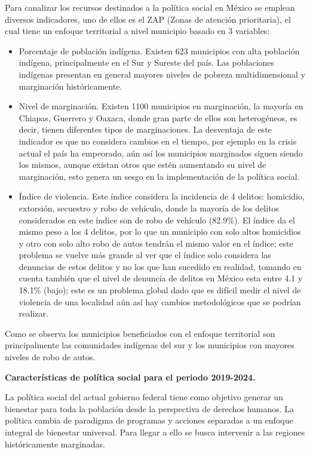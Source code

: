 Para canalizar los recursos destinados a la política social en México se emplean diversos indicadores, uno de ellos es el ZAP (Zonas de atención prioritaria), el cual tiene un enfoque territorial a nivel municipio basado en 3 variables:
\begin{itemize}
    \item Porcentaje de población indígena. Existen 623 municipios con alta población indígena, principalmente en el Sur y Sureste del país. Las poblaciones indígenas presentan en general mayores niveles de pobreza multidimensional y marginación históricamente.
    \item Nivel de marginación. Existen 1100 municipios en marginación, la mayoría en Chiapas, Guerrero y Oaxaca, donde gran parte de ellos son heterogéneos, es decir, tienen diferentes tipos de marginaciones. La desventaja de este indicador es que no considera cambios en el tiempo, por ejemplo en la crisis actual el país ha empeorado, aún así los municipios marginados siguen siendo los mismos, aunque existan otros que estén aumentando su nivel de marginación, esto genera un sesgo en la implementación de la política social.
    \item Índice de violencia. Este índice considera la incidencia de 4 delitos: homicidio, extorsión, secuestro y robo de vehículo, donde la mayoría de los delitos considerados en este índice son de robo de vehículo (82.9\%). El índice da el mismo peso a los 4 delitos, por lo que un municipio con solo altos homicidios y otro con solo alto robo de autos tendrán el mismo valor en el índice; este problema se vuelve más grande al ver que el índice solo considera las denuncias de estos delitos y no los que han sucedido en realidad, tomando en cuenta también que el nivel de denuncia de delitos en México esta entre 4.1 y 18.1\% (bajo); este es un problema global dado que es difícil medir el nivel de violencia de una localidad aún así hay cambios metodológicos que se podrían realizar.
\end{itemize}
Como se observa los municipios beneficiados con el enfoque territorial son principalmente las comunidades indígenas del sur y los municipios con mayores niveles de robo de autos.

\textbf{Características de política social para el periodo 2019-2024.}

La política social del actual gobierno federal tiene como objetivo generar un bienestar para toda la población desde la perspectiva de derechos humanos. La política cambia de paradigma de programas y acciones separadas a un enfoque integral de bienestar universal. Para llegar a ello se busca intervenir a las regiones históricamente marginadas.

